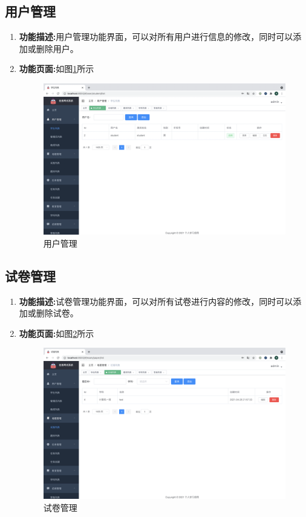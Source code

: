 \subsection{用户管理}
\begin{enumerate}
	\item[] \textbf{功能描述:}用户管理功能界面，可以对所有用户进行信息的修改，同时可以添加或删除用户。
	\item[] \textbf{功能页面:}如图\ref{figure:yonghu}所示 \\
		\begin{figure}[H]
			\centering
			\includegraphics[width=1.0\textwidth,keepaspectratio]{data/chapter-5/yonghu.png}
			\caption{用户管理}
			\label{figure:yonghu}
		\end{figure}
\end{enumerate}

\subsection{试卷管理}
\begin{enumerate}
	\item[] \textbf{功能描述:}试卷管理功能界面，可以对所有试卷进行内容的修改，同时可以添加或删除试卷。
	\item[] \textbf{功能页面:}如图\ref{figure:shijuan}所示 \\
		\begin{figure}[H]
			\centering
			\includegraphics[width=1.0\textwidth,keepaspectratio]{data/chapter-5/shijuan.png}
			\caption{试卷管理}
			\label{figure:shijuan}
		\end{figure}
\end{enumerate}

